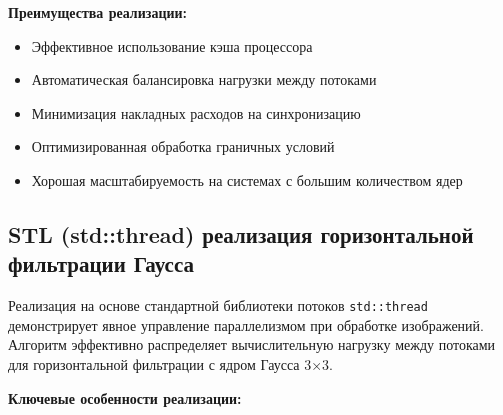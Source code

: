 \documentclass[12pt]{article}
\begin{document}
\textbf{Преимущества реализации:}
\begin{itemize}
\item Эффективное использование кэша процессора
\item Автоматическая балансировка нагрузки между потоками
\item Минимизация накладных расходов на синхронизацию
\item Оптимизированная обработка граничных условий
\item Хорошая масштабируемость на системах с большим количеством ядер
\end{itemize}

\subsection{STL (std::thread) реализация горизонтальной фильтрации Гаусса}

\hspace*{1.25em}Реализация на основе стандартной библиотеки потоков \texttt{std::thread} демонстрирует явное управление параллелизмом при обработке изображений. Алгоритм эффективно распределяет вычислительную нагрузку между потоками для горизонтальной фильтрации с ядром Гаусса 3×3.

\textbf{Ключевые особенности реализации:}
\end{document}
